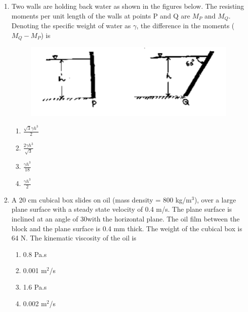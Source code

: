 \documentclass[a4paper,10pt]{article}
\begin{document}
\begin{enumerate}
\begin{multicols}{4}
\begin{enumerate}
\item 49.275
\item 94.275
\item 9.4275
\item 492.75
\end{enumerate}
\end{multicols}

\item Two walls are holding back water as shown in the figures below. The resisting moments per unit length of the walls at points P and Q are $M_P$ and $M_Q$. Denoting the specific weight of water as $\gamma$, the difference in the moments ($M_Q - M_P$) is
\begin{figure}[H]
    \centering
    \includegraphics[width=0.6\columnwidth]{Bq15.png}
    \caption*{}
    \label{fig:q15}
\end{figure}
\hfill{}

\begin{multicols}{2}
\begin{enumerate}
\item $\frac{\sqrt{3}\gamma h^3}{2}$
\item $\frac{2\gamma h^3}{\sqrt{3}}$
\item $\frac{\gamma h^3}{18}$
\item $\frac{\gamma h^3}{2}$
\end{enumerate}
\end{multicols}

\item A 20 cm cubical box slides on oil (mass density = 800 kg/m$^3$), over a large plane surface with a steady state velocity of 0.4 m/s. The plane surface is inclined at an angle of 30\degree with the horizontal plane. The oil film between the block and the plane surface is 0.4 mm thick. The weight of the cubical box is 64 N. The kinematic viscosity of the oil is
\hfill{}

\begin{multicols}{2}
\begin{enumerate}
\item 0.8 Pa.s
\item 0.001 m$^2$/s
\item 1.6 Pa.s
\item 0.002 m$^2$/s
\end{enumerate}
\end{multicols}


\end{enumerate}
\end{document}
